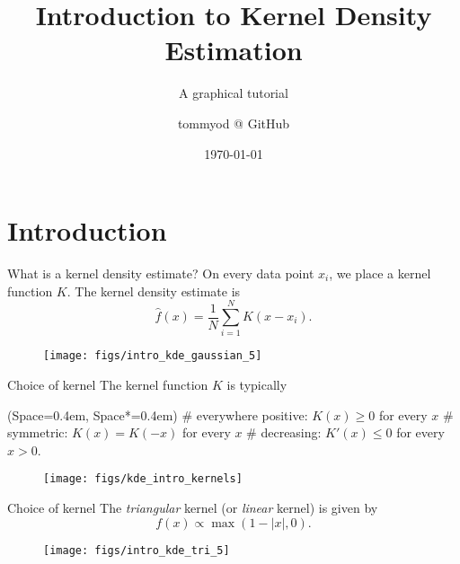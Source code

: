 \documentclass[11pt, aspectratio=149]{beamer}
\title{Introduction to Kernel Density Estimation}
\subtitle{A graphical tutorial}
\date{\today}
\author{tommyod @ GitHub}
\newcommand{\listSpace}{0.4em}
\theoremstyle{plain}
\begin{document}
\maketitle


\section{Introduction}

\begin{frame}[fragile, t]{What is a kernel density estimate?}
	On every data point $x_i$, we place a kernel function $K$.
	The kernel density estimate is 
	\begin{equation*}
		\hat{f}(x) = \frac{1}{N} \sum_{i=1}^{N} K(x - x_i).
	\end{equation*}
	\vfill
	\begin{figure}
		\centering
		\texttt{[image: figs/intro\_kde\_gaussian\_5]}
	\end{figure}
\end{frame}


\begin{frame}[fragile, t]{Choice of kernel}
	The kernel function $K$ is typically
	\vspace{1em}
	\begin{easylist}[itemize]
		\ListProperties(Space=\listSpace, Space*=\listSpace)
		# everywhere positive: $K(x) \geq 0$ for every $x$
		# symmetric: $K(x) = K(-x)$  for every $x$
		# decreasing: $K'(x) \leq 0$  for every $x > 0$.
	\end{easylist}
	\vfill
	\begin{figure}
		\centering
		\texttt{[image: figs/kde\_intro\_kernels]}
	\end{figure}
\end{frame}


\begin{frame}[fragile, t]{Choice of kernel}
	The \emph{triangular} kernel (or \emph{linear} kernel) is given by
	\begin{equation*}
		f(x) \propto \max(1 - |x|, 0).
	\end{equation*}
	\vfill
	\begin{figure}
		\centering
		\texttt{[image: figs/intro\_kde\_tri\_5]}
	\end{figure}
\end{frame}
\end{document}
